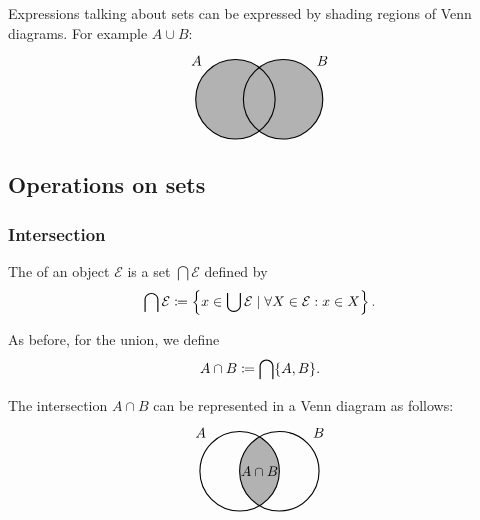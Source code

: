 Expressions talking about sets can be expressed by shading regions of Venn diagrams. For example $A\cup B$:
\[ \begin{tikzpicture}[thick,
    set/.style = {circle,
        minimum size = 2cm,
        fill=black!30}]

\node[set,label={135:$A$}] (A) at (0,0) {};

\node[set,label={45:$B$}] (B) at (1.2,0) {};

\draw (0,0) circle(1cm);
\draw (1.2,0) circle(1cm);
\end{tikzpicture} \]

\subsection{Operations on sets}
\subsubsection{Intersection}
\begin{definition}
The  of an object $\mathcal{E}$ is a set $\bigcap \mathcal{E}$ defined by
\[ \bigcap \mathcal{E} \coloneqq \left\{ x\in \bigcup\mathcal{E} \;|\; \forall X\in \mathcal{E}: x\in X \right\}. \]
\end{definition}
As before, for the union, we define
\[ A\cap B \coloneqq \bigcap \{A,B\}. \]

The intersection $A\cap B$ can be represented in a Venn diagram as follows:
\[ \begin{tikzpicture}[thick,
    set/.style = {circle,
        minimum size = 2cm}]

\node[set,label={135:$A$}] (A) at (0,0) {};

\node[set,label={45:$B$}] (B) at (1,0) {};

\begin{scope}
    \clip (0,0) circle(1cm);
    \clip (1,0) circle(1cm);
    \fill[black!30](0,0) circle(1cm);
\end{scope}

\draw (0,0) circle(1cm);
\draw (1,0) circle(1cm);

\node at (0.5,0) {$A\cap B$};
\end{tikzpicture} \]

